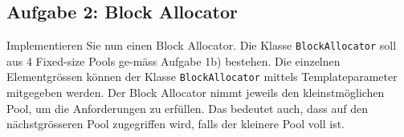 \subsection{Aufgabe 2: Block Allocator}
Implementieren Sie nun einen Block Allocator. Die Klasse \texttt{BlockAllocator} soll aus 4 Fixed-size Pools ge-mäss Aufgabe 1b) bestehen. Die einzelnen Elementgrössen können der Klasse \texttt{BlockAllocator} mittels Templateparameter mitgegeben werden. Der Block Allocator nimmt jeweils den kleinstmöglichen Pool, um die Anforderungen zu erfüllen. Das bedeutet auch, dass auf den nächstgrösseren Pool zugegriffen wird, falls der kleinere Pool voll ist.

\noindent\makebox[\linewidth]{\rule{\paperwidth}{0.4pt}}

\noindent\makebox[\linewidth]{\rule{\paperwidth}{0.4pt}}

\noindent\makebox[\linewidth]{\rule{\paperwidth}{0.4pt}}
